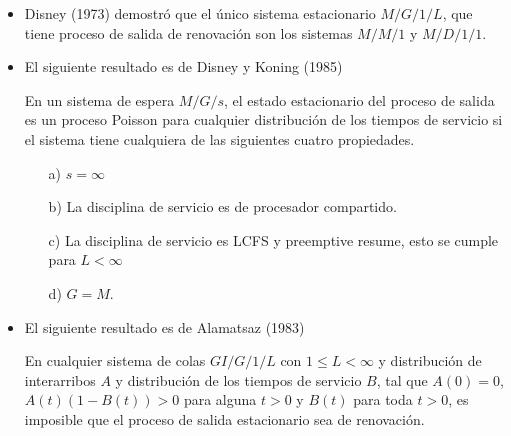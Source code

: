 \begin{itemize}
\item Disney (1973) demostr\'o que el \'unico sistema estacionario $M/G/1/L$, que tiene proceso de salida de renovaci\'on  son los sistemas $M/M/1$ y $M/D/1/1$.



\item El siguiente resultado es de Disney y Koning (1985)
\begin{Teo}
En un sistema de espera $M/G/s$, el estado estacionario del proceso de salida es un proceso Poisson para cualquier distribuci\'on de los tiempos de servicio si el sistema tiene cualquiera de las siguientes cuatro propiedades.

\begin{itemize}
\item[a)] $s=\infty$
\item[b)] La disciplina de servicio es de procesador compartido.
\item[c)] La disciplina de servicio es LCFS y preemptive resume, esto se cumple para $L<\infty$
\item[d)] $G=M$.
\end{itemize}

\end{Teo}

\item El siguiente resultado es de Alamatsaz (1983)

\begin{Teo}
En cualquier sistema de colas $GI/G/1/L$ con $1\leq L<\infty$ y distribuci\'on de interarribos $A$ y distribuci\'on de los tiempos de servicio $B$, tal que $A\left(0\right)=0$, $A\left(t\right)\left(1-B\left(t\right)\right)>0$ para alguna $t>0$ y $B\left(t\right)$ para toda $t>0$, es imposible que el proceso de salida estacionario sea de renovaci\'on.
\end{Teo}

\end{itemize}





